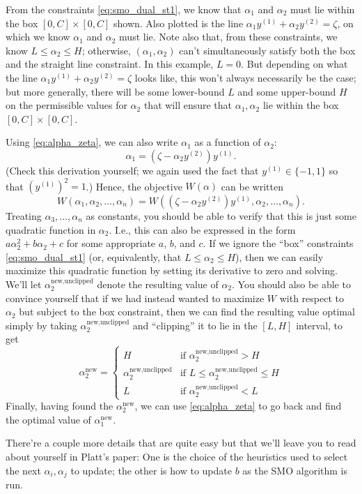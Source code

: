 From the constraints \ref{eq:smo_dual_st1}, we know that $\alpha_1$ and $\alpha_2$ must lie within the box
$[0,C]\times[0,C]$ shown. Also plotted is the line $\alpha_1 y^{(1)} +\alpha_2 y^{(2)} = \zeta$, on which we
know $\alpha_1$ and $\alpha_2$ must lie. Note also that, from these constraints, we know
$L \le \alpha_2 \le H$; otherwise, $(\alpha_1 ,\alpha_2 )$ can't simultaneously satisfy both the box
and the straight line constraint. In this example, $L = 0$. But depending on
what the line $\alpha_1 y^{(1)} + \alpha_2 y^{(2)} = \zeta$ looks like, this won't always necessarily be
the case; but more generally, there will be some lower-bound $L$ and some
upper-bound $H$ on the permissible values for $\alpha_2$ that will ensure that $\alpha_1 , \alpha_2$
lie within the box $[0,C] \times [0,C]$.

Using \cref{eq:alpha_zeta}, we can also write $\alpha_1$ as a function of $\alpha_2$:
\begin{equation*}
    \alpha_1 = (\zeta - \alpha_2 y^{(2)} )y^{(1)}.
\end{equation*}
(Check this derivation yourself; we again used the fact that $y^{(1)} \in \{-1,1\}$ so
that $(y^{(1)})^2 = 1$.) Hence, the objective $W(\alpha)$ can be written
\begin{equation*}
    W(\alpha_1 ,\alpha_2 ,\ldots,\alpha_n ) = W((\zeta - \alpha_2 y^{(2)} )y^{(1)} ,\alpha_2 ,\ldots,\alpha_n ).
\end{equation*}
Treating $\alpha_3 ,\ldots,\alpha_n$ as constants, you should be able to verify that this is
just some quadratic function in $\alpha_2$. I.e., this can also be expressed in the
form $a\alpha_2^2 + b\alpha_2 + c$ for some appropriate $a$, $b$, and $c$. If we ignore the ``box''
constraints \ref{eq:smo_dual_st1} (or, equivalently, that $L \le \alpha_2 \le H$), then we can easily
maximize this quadratic function by setting its derivative to zero and solving.
We'll let $\alpha^{\text{new,unclipped}}_2$
denote the resulting value of $\alpha_2$. You should also be
able to convince yourself that if we had instead wanted to maximize $W$ with
respect to $\alpha_2$ but subject to the box constraint, then we can find the resulting
value optimal simply by taking $\alpha^{\text{new,unclipped}}_2$
and ``clipping'' it to lie in the $[L,H]$ interval, to get
\begin{equation*}
    \alpha^\text{new}_2 = \begin{cases}
        H & \text{if } \alpha^\text{new,unclipped}_2 > H\\
        \alpha^\text{new,unclipped}_2 & \text{if } L \le \alpha^\text{new,unclipped}_2 \le H\\
        L & \text{if } \alpha^\text{new,unclipped}_2 < L
    \end{cases}
\end{equation*}
Finally, having found the $\alpha^\text{new}_2$, we can use \cref{eq:alpha_zeta} to go back and find
the optimal value of $\alpha^\text{new}_1$.

There're a couple more details that are quite easy but that we'll leave you
to read about yourself in Platt's paper: One is the choice of the heuristics
used to select the next $\alpha_i , \alpha_j$ to update; the other is how to update $b$ as the
SMO algorithm is run.
